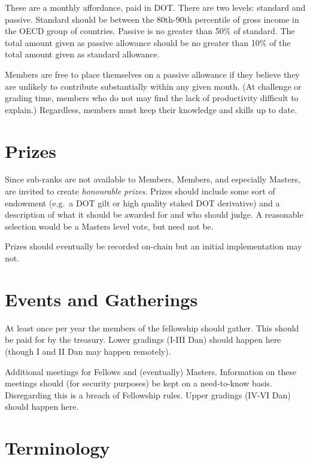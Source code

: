 \documentclass[9pt,oneside]{amsart}
\begin{document}
These are a monthly affordance, paid in DOT. There are two levels: standard and passive. Standard should be between the 80th-90th percentile of gross income in the OECD group of countries. Passive is no greater than 50\% of standard. The total amount given as passive allowance should be no greater than 10\% of the total amount given as standard allowance.

Members are free to place themselves on a passive allowance if they believe they are unlikely to contribute substantially within any given month. (At challenge or grading time, members who do not may find the lack of productivity difficult to explain.) Regardless, members must keep their knowledge and skills up to date.

\section{Prizes}\label{prizes}

Since sub-ranks are not available to Members, Members, and especially Masters, are invited to create \emph{honourable prizes}. Prizes should include some sort of endowment (e.g.~a DOT gilt or high quality staked DOT derivative) and a description of what it should be awarded for and who should judge. A reasonable selection would be a Masters level vote, but need not be.

Prizes should eventually be recorded on-chain but an initial implementation may not.

\section{Events and Gatherings}\label{events-and-gatherings}

At least once per year the members of the fellowship should gather. This should be paid for by the treasury. Lower gradings (I-III Dan) should happen here (though I and II Dan may happen remotely).

Additional meetings for Fellows and (eventually) Masters. Information on these meetings should (for security purposes) be kept on a need-to-know basis. Disregarding this is a breach of Fellowship rules. Upper gradings (IV-VI Dan) should happen here.

\appendix

\section{Terminology}\label{terminology}
\end{document}
